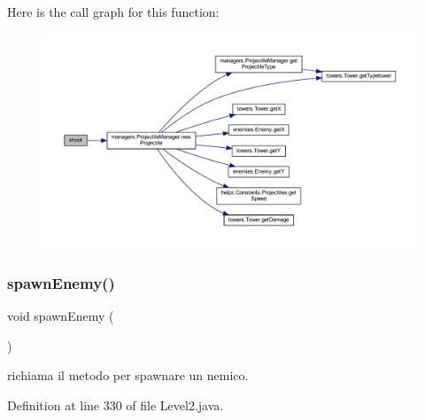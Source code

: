 Here is the call graph for this function\+:
\nopagebreak
\begin{figure}[H]
\begin{center}
\leavevmode
\includegraphics[width=350pt]{classscenes_1_1_level2_a200b073564fc341f34b6112718742bae_cgraph}
\end{center}
\end{figure}
\mbox{\label{classscenes_1_1_level2_addfc0c3129b6ff606f7276e175f31a15}} 
\subsubsection{\texorpdfstring{spawn\+Enemy()}{spawnEnemy()}}
{\footnotesize\ttfamily void spawn\+Enemy (\begin{DoxyParamCaption}{ }\end{DoxyParamCaption})\hspace{0.3cm}{\ttfamily [private]}}



richiama il metodo per spawnare un nemico. 



Definition at line 330 of file Level2.\+java.

